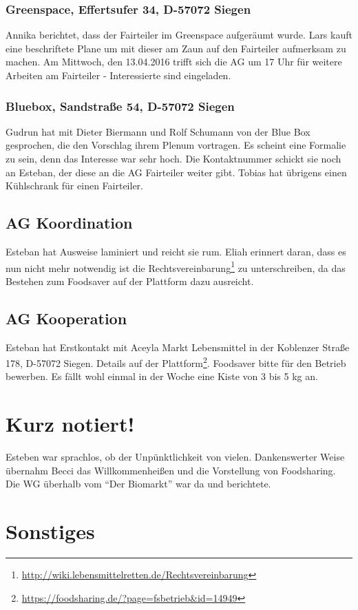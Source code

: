 \documentclass{scrreprt}
\begin{document}
\subsection{Greenspace, Effertsufer 34, D-57072 Siegen}
Annika berichtet, dass der Fairteiler im Greenspace aufgeräumt wurde. Lars kauft eine beschriftete Plane um mit dieser am Zaun auf den Fairteiler aufmerksam zu machen. Am Mittwoch, den 13.04.2016 trifft sich die AG um 17 Uhr für weitere Arbeiten am Fairteiler - Interessierte sind eingeladen.
\subsection{Bluebox, Sandstraße 54, D-57072 Siegen}
Gudrun hat mit Dieter Biermann und Rolf Schumann von der Blue Box gesprochen, die den Vorschlag ihrem Plenum vortragen. Es scheint eine Formalie zu sein, denn das Interesse war sehr hoch. Die Kontaktnummer schickt sie noch an Esteban, der diese an die AG Fairteiler weiter gibt. Tobias hat übrigens einen Kühlschrank für einen Fairteiler.
\section{AG Koordination}
Esteban hat Ausweise laminiert und reicht sie rum. Eliah erinnert daran, dass es nun nicht mehr notwendig ist die Rechtsvereinbarung\footnote{\url{http://wiki.lebensmittelretten.de/Rechtsvereinbarung}} zu unterschreiben, da das Bestehen zum Foodsaver auf der Plattform dazu ausreicht. 
\section{AG Kooperation}
Esteban hat Erstkontakt mit Aceyla Markt Lebensmittel in der Koblenzer Straße 178, D-57072 Siegen. Details auf der Plattform\footnote{\url{https://foodsharing.de/?page=fsbetrieb&id=14949}}. Foodsaver bitte für den Betrieb bewerben. Es fällt wohl einmal in der Woche eine Kiste von 3 bis 5 kg an.  
\chapter{Kurz notiert!}
Esteben war sprachlos, ob der Unpünktlichkeit von vielen. Dankenswerter Weise übernahm Becci das Willkommenheißen und die Vorstellung von Foodsharing.\\
Die WG überhalb vom \enquote{Der Biomarkt} war da und berichtete.
\chapter{Sonstiges}
\end{document}
